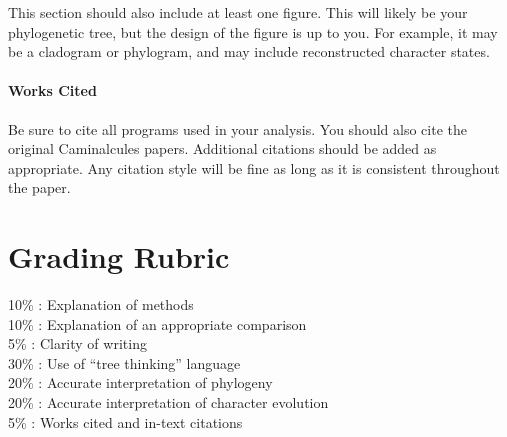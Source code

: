 \documentclass[12pt]{article}
\begin{document}
This section should also include at least one figure.
This will likely be your phylogenetic tree, but the design of the figure is up to you. 
For example, it may be a cladogram or phylogram, and may include reconstructed character states.

\paragraph{Works Cited}
Be sure to cite all programs used in your analysis. 
You should also cite the original Caminalcules papers.
Additional citations should be added as appropriate. 
Any citation style will be fine as long as it is consistent throughout the paper.


\section{Grading Rubric}

10\% : Explanation of methods\\
10\% : Explanation of an appropriate comparison\\
5\% : Clarity of writing\\
30\% : Use of ``tree thinking'' language\\
20\% : Accurate interpretation of phylogeny\\
20\% : Accurate interpretation of character evolution\\
5\% : Works cited and in-text citations\\
\end{document}
